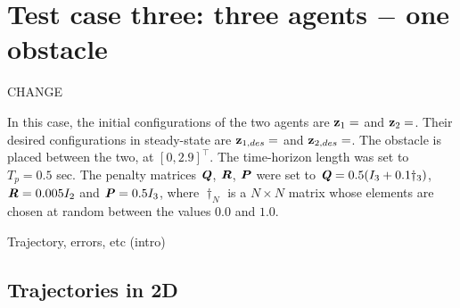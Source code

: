 \section{Test case three: three agents $-$ one obstacle}

CHANGE

In this case, the initial configurations of the two agents are
$\bm{\mathbf{z}}_1 = $ and
$\bm{\mathbf{z}}_2 = $.
Their desired configurations in steady-state are
$\bm{\mathbf{z}}_{1,des} = $ and
$\bm{\mathbf{z}}_{2,des} = $.
The obstacle is placed between the two, at $[0, 2.9]^{\top}$. The time-horizon
length was set to $T_p = 0.5$ sec. The penalty matrices $\bm{\mathit{Q}}$, $\bm{\mathit{R}}$,
$\bm{\mathit{P}}$ were set to $\bm{\mathit{Q}} = 0.5 (I_3 + 0.1 \dagger_3)$,
$\bm{\mathit{R}} = 0.005 I_2$ and $\bm{\mathit{P}} = 0.5 I_3$, where $\dagger_N$ is a
$N \times N$ matrix whose elements are chosen at random between the values $0.0$
and $1.0$.

Trajectory, errors, etc (intro)


\subsection{Trajectories in 2D}

\noindent{}

\noindent{}

